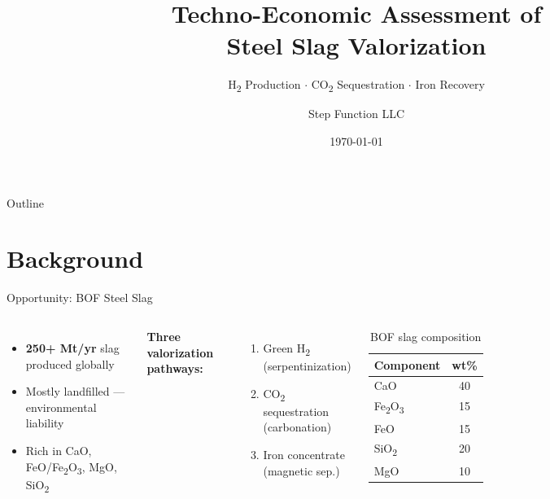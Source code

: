 \documentclass[aspectratio=169]{beamer}
\title{Techno-Economic Assessment of\\[4pt] \textbf{Steel Slag} Valorization}
\subtitle{H\textsubscript{2} Production $\cdot$ CO\textsubscript{2} Sequestration $\cdot$ Iron Recovery}
\author{Step Function LLC}
\institute{Separation-Agents Framework}
\date{\today}
\begin{document}
\begin{frame}
\titlepage
\end{frame}

\begin{frame}{Outline}
\tableofcontents
\end{frame}

\section{Background}

\begin{frame}{Opportunity: BOF Steel Slag}
\begin{columns}
\begin{itemize}
    \item \textbf{250+ Mt/yr} slag produced globally
    \item Mostly landfilled — environmental liability
    \item Rich in CaO, FeO/Fe\textsubscript{2}O\textsubscript{3}, MgO, SiO\textsubscript{2}
\end{itemize}
\vspace{8pt}
\textbf{Three valorization pathways:}
\begin{enumerate}
    \item Green H\textsubscript{2} (serpentinization)
    \item CO\textsubscript{2} sequestration (carbonation)
    \item Iron concentrate (magnetic sep.)
\end{enumerate}

\begin{table}
\centering
\small
\begin{tabular}{@{}lc@{}}
\toprule
\textbf{Component} & \textbf{wt\%} \\
\midrule
CaO & 40 \\
Fe\textsubscript{2}O\textsubscript{3} & 15 \\
FeO & 15 \\
SiO\textsubscript{2} & 20 \\
MgO & 10 \\
\bottomrule
\end{tabular}
\caption*{BOF slag composition}
\end{table}
\end{columns}
\end{frame}
\end{document}
